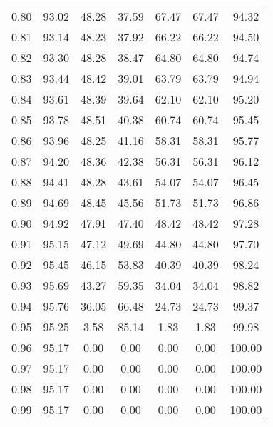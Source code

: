 \begin{tabular}{|c|c|c|c|c|c|c|}
      0.80 &     93.02 &     48.28 &      37.59 &   67.47 &      67.47 &         94.32 \\
      0.81 &     93.14 &     48.23 &      37.92 &   66.22 &      66.22 &         94.50 \\
      0.82 &     93.30 &     48.28 &      38.47 &   64.80 &      64.80 &         94.74 \\
      0.83 &     93.44 &     48.42 &      39.01 &   63.79 &      63.79 &         94.94 \\
      0.84 &     93.61 &     48.39 &      39.64 &   62.10 &      62.10 &         95.20 \\
      0.85 &     93.78 &     48.51 &      40.38 &   60.74 &      60.74 &         95.45 \\
      0.86 &     93.96 &     48.25 &      41.16 &   58.31 &      58.31 &         95.77 \\
      0.87 &     94.20 &     48.36 &      42.38 &   56.31 &      56.31 &         96.12 \\
      0.88 &     94.41 &     48.28 &      43.61 &   54.07 &      54.07 &         96.45 \\
      0.89 &     94.69 &     48.45 &      45.56 &   51.73 &      51.73 &         96.86 \\
      0.90 &     94.92 &     47.91 &      47.40 &   48.42 &      48.42 &         97.28 \\
      0.91 &     95.15 &     47.12 &      49.69 &   44.80 &      44.80 &         97.70 \\
      0.92 &     95.45 &     46.15 &      53.83 &   40.39 &      40.39 &         98.24 \\
      0.93 &     95.69 &     43.27 &      59.35 &   34.04 &      34.04 &         98.82 \\
      0.94 &     95.76 &     36.05 &      66.48 &   24.73 &      24.73 &         99.37 \\
      0.95 &     95.25 &      3.58 &      85.14 &    1.83 &       1.83 &         99.98 \\
      0.96 &     95.17 &      0.00 &       0.00 &    0.00 &       0.00 &        100.00 \\
      0.97 &     95.17 &      0.00 &       0.00 &    0.00 &       0.00 &        100.00 \\
      0.98 &     95.17 &      0.00 &       0.00 &    0.00 &       0.00 &        100.00 \\
      0.99 &     95.17 &      0.00 &       0.00 &    0.00 &       0.00 &        100.00 \\
\bottomrule
\end{tabular}
